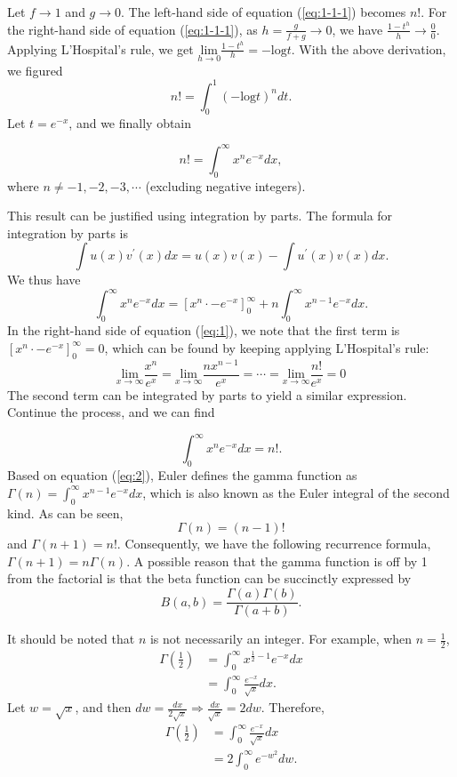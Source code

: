 \documentclass[12pt,oneside,english,american,flalign]{book}\usepackage[]{graphicx}\usepackage[]{color}
\begin{document}
\noindent Let $f\rightarrow1$ and $g\rightarrow0$. The left-hand
side of equation (\ref{eq:1-1-1}) becomes $n!$. For the right-hand
side of equation (\ref{eq:1-1-1}), as $h=\frac{g}{f+g}\rightarrow0$,
we have $\frac{1-t^{h}}{h}\rightarrow\frac{0}{0}$. Applying L'Hospital's
rule, we get $\underset{h\rightarrow0}{\textrm{lim}}\frac{1-t^{h}}{h}=-\textrm{log}t$.
With the above derivation, we figured 
\[
n!=\int_{0}^{1}\left(-\textrm{log}t\right)^{n}dt.
\]
Let $t=e^{-x}$, and we finally obtain

\noindent 
\[
n!=\int_{0}^{\infty}x^{n}e^{-x}dx,
\]
where $n\neq-1,-2,-3,\cdots$ (excluding negative integers). 

This result can be justified using integration by parts. The formula
for integration by parts is
\[
\int u\left(x\right)v^{\prime}\left(x\right)dx=u\left(x\right)v\left(x\right)-\int u^{\prime}\left(x\right)v\left(x\right)dx.
\]
We thus have 
\begin{equation}
\int_{0}^{\infty}x^{n}e^{-x}dx=\left[x^{n}\cdot-e^{-x}\right]_{0}^{\infty}+n\int_{0}^{\infty}x^{n-1}e^{-x}dx.\label{eq:1}
\end{equation}
In the right-hand side of equation (\ref{eq:1}), we note that the
first term is $\left[x^{n}\cdot-e^{-x}\right]_{0}^{\infty}=0$, which
can be found by keeping applying L\textquoteright Hospital\textquoteright s
rule:
\[
\underset{x\rightarrow\infty}{\textrm{lim}}\frac{x^{n}}{e^{x}}=\underset{x\rightarrow\infty}{\textrm{lim}}\frac{nx^{n-1}}{e^{x}}=\cdots=\underset{x\rightarrow\infty}{\textrm{lim}}\frac{n!}{e^{x}}=0
\]
The second term can be integrated by parts to yield a similar expression.
Continue the process, and we can find

\noindent 
\begin{equation}
\int_{0}^{\infty}x^{n}e^{-x}dx=n!.\label{eq:2}
\end{equation}
Based on equation (\ref{eq:2}), Euler defines the gamma function
as $\Gamma\left(n\right)=\int_{0}^{\infty}x^{n-1}e^{-x}dx$, which
is also known as the Euler integral of the second kind. As can be
seen, 
\[
\Gamma\left(n\right)=\left(n-1\right)!
\]
and $\Gamma\left(n+1\right)=n!$. Consequently, we have the following
recurrence formula, $\Gamma\left(n+1\right)=n\Gamma\left(n\right)$.
A possible reason that the gamma function is off by 1 from the factorial
is that the beta function can be succinctly expressed by
\[
B\left(a,b\right)=\frac{\Gamma\left(a\right)\Gamma\left(b\right)}{\Gamma\left(a+b\right)}.
\]

It should be noted that $n$ is not necessarily an integer. For example,
when $n=\frac{1}{2}$, 
\begin{align*}
\Gamma\left(\frac{1}{2}\right) & =\int_{0}^{\infty}x^{\frac{1}{2}-1}e^{-x}dx\\
 & =\int_{0}^{\infty}\frac{e^{-x}}{\sqrt{x}}dx.
\end{align*}
Let $w=\sqrt{x}$, and then $dw=\frac{dx}{2\sqrt{x}}\Rightarrow\frac{dx}{\sqrt{x}}=2dw$.
Therefore, 
\begin{align*}
\Gamma\left(\frac{1}{2}\right) & =\int_{0}^{\infty}\frac{e^{-x}}{\sqrt{x}}dx\\
 & =2\int_{0}^{\infty}e^{-w^{2}}dw.
\end{align*}
\end{document}
